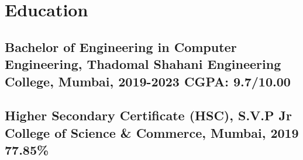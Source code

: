 \documentclass[a4,10pt]{article}
\newcommand{\subtext}[1]{
#1\par\vspace{-0.2cm}}
\newcommand{\hskills}[1]{
\textbf{\bfseries #1} }
\begin{document}



\section{Education }
\subsection*{Bachelor of Engineering in Computer Engineering, {\normalsize \normalfont Thadomal Shahani Engineering College, Mumbai, 2019-2023} \hfill CGPA: 9.7/10.00} 
\vspace{0.1cm}
\subsection*{Higher Secondary Certificate (HSC), {\normalsize \normalfont S.V.P Jr College of Science \& Commerce, Mumbai, 2019} \hfill 77.85\%} 
\vspace{0.1cm}
\end{document}
